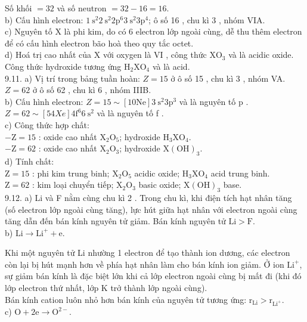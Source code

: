\documentclass[10pt]{article}
\begin{document}
Số khối $=32$ và số neutron $=32-16=16$.\\
b) Cấu hình electron: $1 \mathrm{~s}^{2} 2 \mathrm{~s}^{2} 2 \mathrm{p}^{6} 3 \mathrm{~s}^{2} 3 \mathrm{p}^{4}$; ô số 16 , chu kì 3 , nhóm VIA.\\
c) Nguyên tố X là phi kim, do có 6 electron lớp ngoài cùng, dễ thu thêm electron để có cấu hình electron bão hoà theo quy tắc octet.\\
d) Hoá trị cao nhất của X với oxygen là VI , công thức $\mathrm{XO}_{3}$ và là acidic oxide. Công thức hydroxide tương ứng $\mathrm{H}_{2} \mathrm{XO}_{4}$ và là acid.\\
9.11. a) Vị trí trong bảng tuần hoàn: $Z=15$ ở ô số 15 , chu kì 3 , nhóm VA.\\
$Z=62$ ở ô số 62 , chu kì 6 , nhóm IIIB.\\
b) Cấu hình electron: $Z=15 \sim[10 \mathrm{Ne}] 3 \mathrm{~s}^{2} 3 \mathrm{p}^{3}$ và là nguyên tố p . $Z=62 \sim[54 X e] 4 \mathrm{f}^{6} 6 \mathrm{~s}^{2}$ và là nguyên tố f .\\
c) Công thức hợp chất:\\
$-\mathrm{Z}=15$ : oxide cao nhất $\mathrm{X}_{2} \mathrm{O}_{5}$; hydroxide $\mathrm{H}_{3} \mathrm{XO}_{4}$.\\
$-\mathrm{Z}=62$ : oxide cao nhất $\mathrm{X}_{2} \mathrm{O}_{3}$; hydroxide $\mathrm{X}(\mathrm{OH})_{3}$.\\
d) Tính chất:\\
$\mathrm{Z}=15$ : phi kim trung binh; $\mathrm{X}_{2} \mathrm{O}_{5}$ acidic oxide; $\mathrm{H}_{3} \mathrm{XO}_{4}$ acid trung binh.\\
$\mathrm{Z}=62$ : kim loại chuyển tiếp; $\mathrm{X}_{2} \mathrm{O}_{3}$ basic oxide; $\mathrm{X}(\mathrm{OH})_{3}$ base.\\
9.12. a) Li và F nằm cùng chu kì 2 . Trong chu kì, khi điện tích hạt nhân tăng (số electron lớp ngoài cùng tăng), lực hút giữa hạt nhân với electron ngoài cùng tăng dẫn đến bán kính nguyên tử giảm. Bán kính nguyên tử $\mathrm{Li}>\mathrm{F}$.\\
b) $\mathrm{Li} \rightarrow \mathrm{Li}^{+}+\mathrm{e}$.

Khi một nguyên tử Li nhường 1 electron để tạo thành ion dương, các electron còn lại bị hút mạnh hơn về phía hạt nhân làm cho bán kính ion giảm. Ở ion $\mathrm{Li}^{+}$, sự giảm bán kính là đặc biệt lớn khi cả lớp electron ngoài cùng bị mất đi (khi đó lớp electron thứ nhất, lớp K trở thành lớp ngoài cùng).\\
Bán kính cation luôn nhỏ hơn bán kính của nguyên tử tương ứng: $\mathrm{r}_{\mathrm{Li}}>\mathrm{r}_{\mathrm{Li}^{+}}$.\\
c) $\mathrm{O}+2 \mathrm{e} \rightarrow \mathrm{O}^{2-}$.
\end{document}

